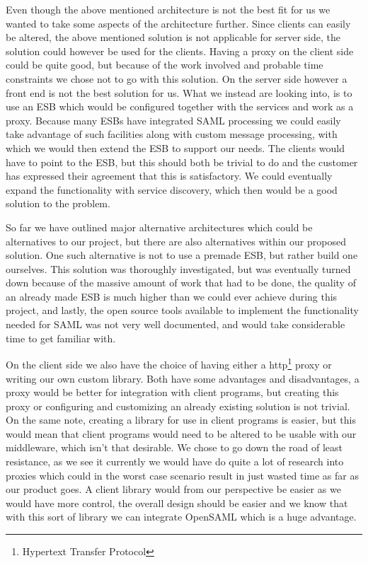         Even though the above mentioned architecture is not the best fit for us we wanted to take some aspects of the architecture further. Since clients can easily be altered, the above mentioned solution is not applicable for server side, the solution could however be used for the clients. Having a proxy on the client side could be quite good, but because of the work involved and probable time constraints we chose not to go with this solution. On the server side however a front end is not the best solution for us. What we instead are looking into, is to use an ESB which would be configured together with the services and work as a proxy. Because many ESBs have integrated SAML processing we could easily take advantage of such facilities along with custom message processing, with which we would then extend the ESB to support our needs. The clients would have to point to the ESB, but this should both be trivial to do and the customer has expressed their agreement that this is satisfactory. We could eventually expand the functionality with service discovery, which then would be a good solution to the problem.

        So far we have outlined major alternative architectures which could be alternatives to our project, but there are also alternatives within our proposed solution. One such alternative is not to use a premade ESB, but rather build one ourselves. This solution was thoroughly investigated, but was eventually turned down because of the massive amount of work that had to be done, the quality of an already made ESB is much higher than we could ever achieve during this project, and lastly, the open source tools available to implement the functionality needed for SAML was not very well documented, and would take considerable time to get familiar with.

        On the client side we also have the choice of having either a \gls{http}\footnote{Hypertext Transfer Protocol} proxy or writing our own custom library. Both have some advantages and disadvantages, a proxy would be better for integration with client programs, but creating this proxy or configuring and customizing an already existing solution is not trivial. On the same note, creating a library for use in client programs is easier, but this would mean that client programs would need to be altered to be usable with our middleware, which isn’t that desirable. We chose to go down the road of least resistance, as we see it currently we would have do quite a lot of research into proxies which could in the worst case scenario result in just wasted time as far as our product goes. A client library would from our perspective be easier as we would have more control, the overall design should be easier and we know that with this sort of library we can integrate OpenSAML which is a huge advantage.  
    

